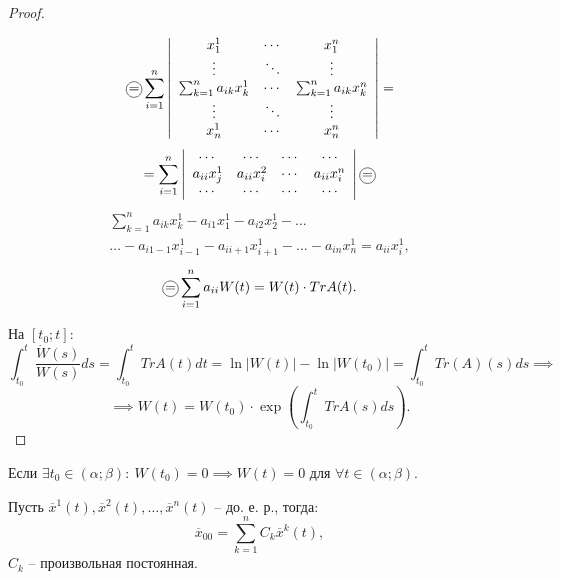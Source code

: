 \begin{proof}
\begin{multline*}
	\end{multline*}
	\[
		\circled{=} \sum_{i=1}^{n} \left|\begin{array}{ccc}
			x_{1}^{1}                      & \cdots & x_{1}^{n}                       \\
			\vdots                         & \ddots & \vdots                          \\
			\sum_{k=1}^{n} a_{ik}x_{k}^{1} & \cdots & \sum_{k=1}^{n} a_{ik} x_{k}^{n} \\
			\vdots                         & \ddots & \vdots                          \\
			x_{n}^{1}                      & \cdots & x_{n}^{n}
		\end{array}\right| =
	\]
	\[
		= \sum_{i=1}^{n} \left|\begin{array}{cccc}
			\cdots           & \cdots           & \cdots & \cdots           \\
			a_{ii} x_{j}^{1} & a_{ii} x_{i}^{2} & \cdots & a_{ii} x_{i}^{n} \\
			\cdots           & \cdots           & \cdots & \cdots
		\end{array}\right| \circled{=}
	\]
	\begin{multline*}
		\sum_{k=1}^{n} a_{ik} x_{k}^{1} - a_{i1} x_{1}^{1} - a_{i2} x_{2}^{1} - \ldots \\
		\ldots - a_{i1 - 1} x_{i - 1}^{1} - a_{ii+1} x_{i+1}^{1} - \ldots - a_{in} x_{n}^{1} = a_{ii} x_{i}^{1} ,
	\end{multline*}
	\[
		\circled{=} \sum_{i=1}^{n} a_{ii} W(t) = W(t) \cdot TrA(t).
	\]

	На $[t_0 ; t ]$:
	\[
		\int_{t_0}^{t} \frac{\dot{W}(s)}{W(s)} ds = \int_{t_0}^{t} TrA(t)dt = \ln\big|W(t)\big| - \ln \big|W(t_0)\big| = \int_{t_0}^{t} Tr(A)(s)ds \implies
	\]
	\[
		\implies W(t) = W(t_0) \cdot \exp \left(\int_{t_0}^{t} TrA(s)ds\right).
	\]
\end{proof}

\begin{corollary}
	Если $\exists t_0 \in (\alpha ; \beta ): \ W(t_0) =0 \implies W(t) = 0$ для $\forall t \in (\alpha ; \beta )$.
\end{corollary}

\begin{theorem}
	Пусть $\overline{x} ^1(t),\overline{x} ^2(t),\ldots ,\overline{x} ^n(t)$ -- до. е. р., тогда:
	\[
		\overline{x}_{00} = \sum_{k=1}^{n} C_k \overline{x} ^k(t),
	\]
	$C_k$ -- произвольная постоянная.
\end{theorem}

